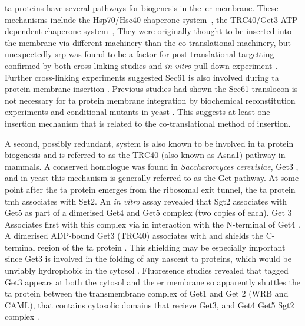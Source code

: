 \gls{ta} proteins have several pathways for biogenesis in the~\gls{er} membrane.
These mechanisms include the Hsp70/Hsc40 chaperone system~\cite{Rabu2008}, the TRC40/Get3 ATP dependent chaperone system~\cite{Johnson2013, Chartron2012, Wang2014},
They were originally thought to be inserted into the membrane via different machinery than the co-translational machinery, but unexpectedly \gls{srp} was found to be a factor for post-translational targetting confirmed by both cross linking studies \cite{Abell2004} and \textit{in vitro} pull down experiment \cite{Leznicki2010}.
Further cross-linking experiments suggested Sec61 is also involved during \gls{ta} protein membrane insertion \cite{Abell2003}.
Previous studies had shown the Sec61 translocon is not necessary for \gls{ta} protein membrane integration by biochemical reconstitution experiments \cite{Kutay1993} and conditional mutants in yeast \cite{Steel2002, Yabal2003}. %
This suggests at least one insertion mechanism that is related to the co-translational method of insertion.

A second, possibly redundant, system is also known to be involved in \gls{ta} protein biogenesis and is referred to as the TRC40 (also known as Asna1) pathway in mammals.
A conserved homologue was found in \textit{Saccharomyces cerevisiae}, Get3 \cite{Schuldiner2008}, and in yeast this mechanism is generally referred to as the Get pathway.
At some point after the \gls{ta} protein emerges from the ribosomal exit tunnel, the \gls{ta} protein \gls{tmh} associates with Sgt2.
An \textit{in vitro} assay revealed that Sgt2 associates with Get5  \cite{Wang2010} as part of a dimerised Get4 and Get5 complex (two copies of each)\cite{Chang2010, Chang2012, Chartron2010, Chartron2012}.
Get 3 Associates first with this complex via in interaction with the N-terminal of Get4 \cite{Wang2010}.
A dimerised ADP-bound Get3 \cite{Mateja2009, Hu2009, Bozkurt2009, Suloway2009, Yamagata2009} (TRC40) associates with and shields the C-terminal region of the \gls{ta} protein \cite{Stefanovic2007, Schuldiner2008, Favaloro2008}.
This shielding may be especially important since Get3 is involved in the folding of any nascent \gls{ta} proteins, which would be unviably hydrophobic in the cytosol \cite{Jonikas2009}.
Fluoresence studies revealed that tagged Get3 appears at both the cytosol and the \gls{er} membrane so apparently shuttles the \gls{ta} protein between the transmembrane complex of Get1 and Get 2 (WRB and CAML), that contains cytosolic domains that recieve Get3, and Get4 Get5 Sgt2 complex \cite{Huh2003}.

